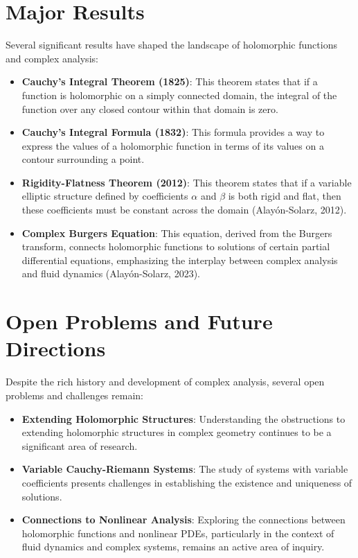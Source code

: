 \documentclass[11pt,a4paper]{article}
\begin{document}
\section{Major Results}
Several significant results have shaped the landscape of holomorphic functions and complex analysis:
\begin{itemize}
\item \textbf{Cauchy's Integral Theorem (1825)}: This theorem states that if a function is holomorphic on a simply connected domain, the integral of the function over any closed contour within that domain is zero.
\item \textbf{Cauchy's Integral Formula (1832)}: This formula provides a way to express the values of a holomorphic function in terms of its values on a contour surrounding a point.
\item \textbf{Rigidity-Flatness Theorem (2012)}: This theorem states that if a variable elliptic structure defined by coefficients \( \alpha \) and \( \beta \) is both rigid and flat, then these coefficients must be constant across the domain (Alayón-Solarz, 2012).
\item \textbf{Complex Burgers Equation}: This equation, derived from the Burgers transform, connects holomorphic functions to solutions of certain partial differential equations, emphasizing the interplay between complex analysis and fluid dynamics (Alayón-Solarz, 2023).
\end{itemize}

\section{Open Problems and Future Directions}
Despite the rich history and development of complex analysis, several open problems and challenges remain:
\begin{itemize}
\item \textbf{Extending Holomorphic Structures}: Understanding the obstructions to extending holomorphic structures in complex geometry continues to be a significant area of research.
\item \textbf{Variable Cauchy-Riemann Systems}: The study of systems with variable coefficients presents challenges in establishing the existence and uniqueness of solutions.
\item \textbf{Connections to Nonlinear Analysis}: Exploring the connections between holomorphic functions and nonlinear PDEs, particularly in the context of fluid dynamics and complex systems, remains an active area of inquiry.
\end{itemize}
\end{document}
